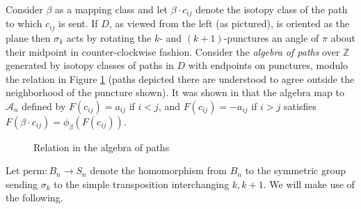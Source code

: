 \documentclass[11pt]{amsart}
\def\Z{{\mathbb Z}}
\def\cl{\mathcal}
\def\s{{\sigma}}
\theoremstyle{definition}
\begin{document}
  Consider $\beta$ as a mapping class and let $\beta\cdot c_{ij}$ denote the isotopy class of the path to which $c_{ij}$ is sent. If $D$, as viewed from the left (as pictured), is oriented as the plane then $\s_k$ acts by rotating the $k\textrm{-}$ and $(k+1)\textrm{-}$punctures an angle of $\pi$ about their midpoint in counter-clockwise fashion. Consider the \emph{algebra of paths} over $\Z$ generated by isotopy classes of paths in $D$ with endpoints on punctures, modulo the relation in Figure \ref{FigRelnPathAlg} (paths depicted there are understood to agree outside the neighborhood of the puncture shown). It was shown in \cite{Ng05} that the algebra map to $\cl A_n$ defined by $F(c_{ij})=a_{ij}$ if $i<j$, and $F(c_{ij})=-a_{ij}$ if $i>j$ satisfies $F(\beta\cdot c_{ij}) = \phi_{\beta}(F(c_{ij}))$.

  \begin{figure}[ht]
\caption{Relation in the algebra of paths}
\label{FigRelnPathAlg}
\end{figure}
  
  Let $\text{perm}:B_n\to S_n$ denote the homomorphism from $B_n$ to the symmetric group sending $\s_k$ to the simple transposition interchanging $k, k+1$. We will make use of the following.
\end{document}

